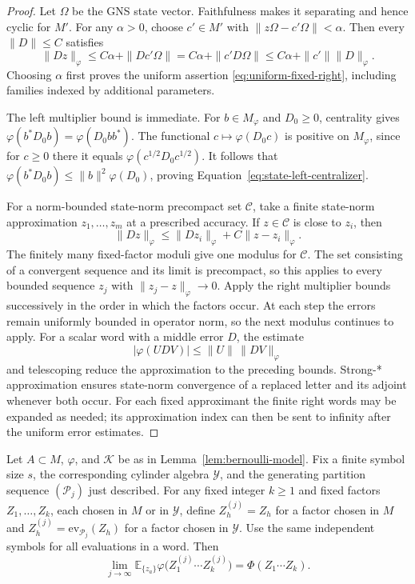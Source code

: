 \begin{proof}
Let $\Omega$ be the GNS state vector. Faithfulness makes it separating
and hence cyclic for $M'$.  For any $\alpha>0$, choose $c'\in M'$ with
$\|z\Omega-c'\Omega\|<\alpha$.  Then every $\|D\|\leq C$ satisfies
\[
 \|Dz\|_\varphi
 \leq C\alpha+\|Dc'\Omega\|
 = C\alpha+\|c'D\Omega\|
 \leq C\alpha+\|c'\|\|D\|_\varphi.
\]
Choosing $\alpha$ first proves the uniform assertion
\eqref{eq:uniform-fixed-right}, including families indexed by additional
parameters.

The left multiplier bound is immediate.  For $b\in M_\varphi$ and
$D_0\geq0$, centrality gives
$\varphi(b^*D_0b)=\varphi(D_0bb^*)$.  The functional
$c\mapsto\varphi(D_0c)$ is positive on $M_\varphi$, since for
$c\geq0$ there it equals $\varphi(c^{1/2}D_0c^{1/2})$.
It follows that
$\varphi(b^*D_0b)\leq\|b\|^2\varphi(D_0)$, proving
Equation~\eqref{eq:state-left-centralizer}.

For a norm-bounded state-norm precompact set $\mathcal C$, take a finite
state-norm approximation $z_1,\ldots,z_m$ at a prescribed accuracy.
If $z\in\mathcal C$ is close to $z_i$, then
\[
 \|Dz\|_\varphi
 \leq\|Dz_i\|_\varphi+C\|z-z_i\|_\varphi.
\]
The finitely many fixed-factor moduli give one modulus for
$\mathcal C$.  The set consisting of a convergent sequence and its
limit is precompact, so this applies to every bounded sequence
$z_j$ with $\|z_j-z\|_\varphi\to0$.
Apply the right multiplier bounds successively in the order in which
the factors occur.  At each step the errors remain uniformly bounded
in operator norm, so the next modulus continues to apply.
For a scalar word with a middle error $D$, the estimate
\[
 |\varphi(UDV)|\leq\|U\|\,\|DV\|_\varphi
\]
and telescoping reduce the approximation to the preceding bounds.
Strong-* approximation ensures state-norm convergence of a replaced
letter and its adjoint whenever both occur.  For each fixed approximant
the finite right words may be expanded as needed; its approximation
index can then be sent to infinity after the uniform error estimates.
\end{proof}

\begin{proposition}
\label{prop:moment-transfer}
Let $A\subset M$, $\varphi$, and $\mathcal K$ be as in
Lemma~\ref{lem:bernoulli-model}. Fix a finite symbol size $s$, the
corresponding cylinder algebra $\mathcal Y$, and the generating
partition sequence $(\mathcal P_j)$ just described. For any fixed
integer $k\ge1$ and fixed factors $Z_1,\ldots,Z_k$, each chosen in
$M$ or in $\mathcal Y$, define $Z_h^{(j)}=Z_h$ for a factor chosen in
$M$ and
$Z_h^{(j)}=\mathrm{ev}_{\mathcal P_j}(Z_h)$ for a factor chosen in
$\mathcal Y$. Use the same independent symbols for all evaluations
in a word. Then
\begin{equation}
 \lim_{j\to\infty}
 \mathbb E_{\{z_a\}}
 \varphi\bigl(Z_1^{(j)}\cdots Z_k^{(j)}\bigr)
   =\Phi(Z_1\cdots Z_k).
 \label{eq:moment-transfer}
\end{equation}
\end{proposition}

